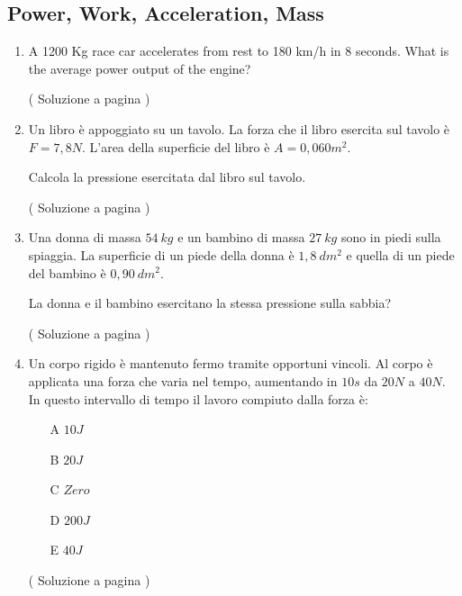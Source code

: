 \subsection{Power, Work, Acceleration, Mass} \label{sec:powoama}

\setcounter{equation}{0}
\begin{enumerate}
\item 
A 1200 Kg race car accelerates from rest to %
180 km/h in %
8 seconds.  What is the average power output of the engine?
\label{ex_f_6} 

( Soluzione a pagina \pageref{sol_f_6} )

\item \label{ex_f_7} 
Un libro è appoggiato su un tavolo. La forza che il libro 
esercita sul tavolo è $F=7,8 N$. L’area della superficie 
del libro è $A=0,060 m^2$.  

Calcola la pressione esercitata dal libro sul tavolo.

( Soluzione a pagina \pageref{sol_f_7} )


\item \label{ex_f_8} 

Una donna di massa $54\: kg$ e un bambino di massa $27\: kg$ sono in piedi sulla spiaggia. La superficie di un piede della donna è $1,8\: dm^2$ e quella di un piede del bambino è $0,90\: dm^2$.

La donna e il bambino esercitano la stessa pressione sulla sabbia?



( Soluzione a pagina \pageref{sol_f_8} )


\item \label{ex_f_9} 

Un corpo rigido è mantenuto fermo tramite opportuni vincoli.
Al corpo è applicata una forza che varia nel tempo, aumentando in $10 s$ da $20 N$ a $40 N$.
In questo intervallo di tempo il lavoro compiuto dalla forza è:

\begin{itemize}
\item[A] $10 J$
\item[B] $20 J$
\item[C] $Zero$
\item[D] $200 J$
\item[E] $40 J$
\end{itemize}


( Soluzione a pagina \pageref{sol_f_9} )




\end{enumerate}


